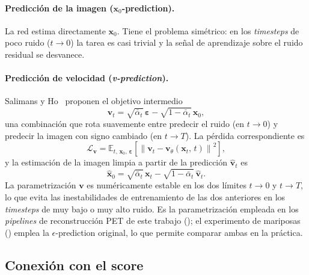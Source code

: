 \paragraph{Predicción de la imagen ($\mathbf{x}_0$-prediction).}
La red estima directamente $\mathbf{x}_0$. Tiene el problema
simétrico: en los \textit{timesteps} de poco ruido ($t \to 0$) la
tarea es casi trivial y la señal de aprendizaje sobre el ruido
residual se desvanece.

\paragraph{Predicción de velocidad (\textit{v-prediction}).}
Salimans y Ho~\cite{salimans2022vprediction} proponen el objetivo
intermedio
\begin{equation}
    \mathbf{v}_t
    = \sqrt{\bar{\alpha}_t}\,\boldsymbol{\varepsilon}
    - \sqrt{1-\bar{\alpha}_t}\,\mathbf{x}_0,
    \label{eq:v-def}
\end{equation}
una combinación que rota suavemente entre predecir el ruido (en
$t \to 0$) y predecir la imagen con signo cambiado (en $t \to T$).
La pérdida correspondiente es
\begin{equation}
    \mathcal{L}_{\mathbf{v}}
    = \mathbb{E}_{t,\, \mathbf{x}_0,\, \boldsymbol{\varepsilon}}
      \!\left[\left\|\mathbf{v}_t
        - \mathbf{v}_\theta(\mathbf{x}_t,\, t)
      \right\|^2\right],
    \label{eq:loss-v}
\end{equation}
y la estimación de la imagen limpia a partir de la predicción
$\hat{\mathbf{v}}_t$ es
\begin{equation}
    \hat{\mathbf{x}}_0
    = \sqrt{\bar{\alpha}_t}\,\mathbf{x}_t
    - \sqrt{1-\bar{\alpha}_t}\,\hat{\mathbf{v}}_t.
    \label{eq:x0-from-v}
\end{equation}
La parametrización $\mathbf{v}$ es numéricamente estable en los dos
límites $t \to 0$ y $t \to T$, lo que evita las inestabilidades de
entrenamiento de las dos anteriores en los \textit{timesteps} de muy
bajo o muy alto ruido. Es la parametrización empleada en los
\textit{pipelines} de reconstrucción PET de este trabajo
(); el experimento de mariposas
() emplea la $\epsilon$-prediction original, lo
que permite comparar ambas en la práctica.

\subsection{Conexión con el score}
\label{subsec:score-conexion}

